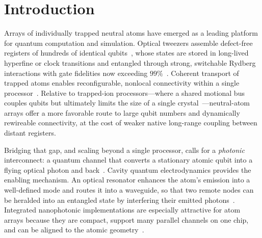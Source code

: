 \documentclass[%
 reprint,
 amsmath,amssymb,
 aps,prx,
 superscriptaddress,
]{revtex4-2}
\begin{document}
\maketitle

\section{Introduction}

Arrays of individually trapped neutral atoms have emerged as a leading platform
for quantum computation and simulation. Optical tweezers assemble defect-free
registers of hundreds of identical qubits~\cite{endres2016,ebadi2021}, whose
states are stored in long-lived hyperfine or clock transitions and entangled
through strong, switchable Rydberg interactions with gate fidelities now
exceeding $99\%$~\cite{evered2023}. Coherent transport of trapped atoms enables
reconfigurable, nonlocal connectivity within a single
processor~\cite{bluvstein2022}. Relative to trapped-ion processors---where a
shared motional bus couples qubits but ultimately limits the size of a single
crystal~\cite{duan2010}---neutral-atom arrays offer a more favorable route to
large qubit numbers and dynamically rewireable connectivity, at the cost of
weaker native long-range coupling between distant registers.

Bridging that gap, and scaling beyond a single processor, calls for a
\emph{photonic} interconnect: a quantum channel that converts a stationary
atomic qubit into a flying optical photon and back~\cite{kimble2008}. Cavity
quantum electrodynamics provides the enabling mechanism. An optical resonator
enhances the atom's emission into a well-defined mode and routes it into a
waveguide, so that two remote nodes can be heralded into an entangled state by
interfering their emitted photons~\cite{reiserer2015,gonzalez2024}. Integrated
nanophotonic implementations are especially attractive for atom arrays because
they are compact, support many parallel channels on one chip, and can be aligned
to the atomic geometry~\cite{suleymanzade2024,menon2024}.
\end{document}
